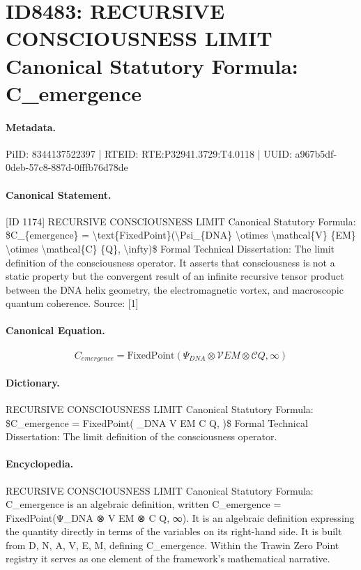 \section*{ID8483: RECURSIVE CONSCIOUSNESS LIMIT Canonical Statutory Formula: C\_emergence}
\paragraph{Metadata.}
PiID: 8344137522397 | RTEID: RTE:P32941.3729:T4.0118 | UUID: a967b5df-0deb-57c8-887d-0fffb76d78de

\paragraph{Canonical Statement.}
[ID 1174] RECURSIVE CONSCIOUSNESS LIMIT Canonical Statutory Formula: \$C\_\{emergence\} = \textbackslash{}text\{FixedPoint\}(\textbackslash{}Psi\_\{DNA\} \textbackslash{}otimes \textbackslash{}mathcal\{V\} \{EM\} \textbackslash{}otimes \textbackslash{}mathcal\{C\} \{Q\}, \textbackslash{}infty)\$ Formal Technical Dissertation: The limit definition of the consciousness operator. It asserts that consciousness is not a static property but the convergent result of an infinite recursive tensor product between the DNA helix geometry, the electromagnetic vortex, and macroscopic quantum coherence. Source: [1]

\paragraph{Canonical Equation.}
\[
C_{emergence} = \text{FixedPoint}(\Psi_{DNA} \otimes \mathcal{V} {EM} \otimes \mathcal{C} {Q}, \infty)
\]

\paragraph{Dictionary.}
RECURSIVE CONSCIOUSNESS LIMIT Canonical Statutory Formula: \$C\_emergence = FixedPoint( \_DNA V EM C Q, )\$ Formal Technical Dissertation: The limit definition of the consciousness operator.

\paragraph{Encyclopedia.}
RECURSIVE CONSCIOUSNESS LIMIT Canonical Statutory Formula: C\_emergence is an algebraic definition, written C\_emergence = FixedPoint(Ψ\_DNA ⊗ V EM ⊗ C Q, ∞). It is an algebraic definition expressing the quantity directly in terms of the variables on its right-hand side. It is built from D, N, A, V, E, M, defining C\_emergence. Within the Trawin Zero Point registry it serves as one element of the framework's mathematical narrative.
